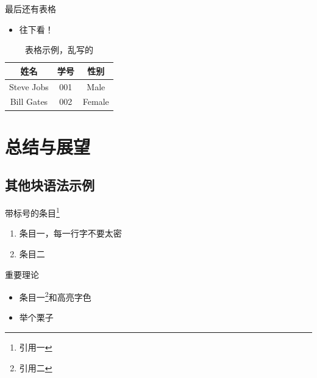 \documentclass[
    fontset=fandol,
    xcolor=svgnames %
]{ctexbeamer}
\begin{document}
\begin{frame}

    \begin{block}{最后还有表格}
        \begin{itemize}
            \item 往下看！
        \end{itemize}
    \end{block}

    \begin{table}
        \begin{tabular}{ccc}
            \hline
            姓名       & 学号 & 性别   \\
            \hline
            Steve Jobs & 001  & Male   \\
            Bill Gates & 002  & Female \\
            \hline
        \end{tabular}
        \caption{表格示例，乱写的}
        \label{fig:table-example}
    \end{table}

\end{frame}

\section{总结与展望}

\subsection{其他块语法示例}

\begin{frame}

    \begin{block}{带标号的条目\footnote{引用一}}
        \begin{enumerate}
            \item 条目一，每一行字不要太密
            \item 条目二
        \end{enumerate}
    \end{block}

    \begin{alertblock}{重要理论}
        \begin{itemize}
            \item 条目一\footnote{引用二}和\alert{高亮字色}
        \end{itemize}
    \end{alertblock}

    \begin{examples}
        \begin{itemize}
            \item 举个栗子
        \end{itemize}
    \end{examples}

\end{frame}
\end{document}

